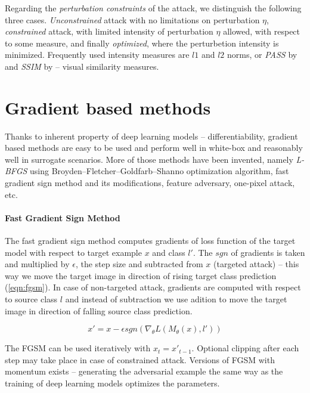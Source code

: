 Regarding the \emph{perturbation constraints} of the attack, we distinguish the following three cases. \emph{Unconstrained} attack with no limitations on perturbation $\eta$, \emph{constrained} attack, with limited intensity of perturbation $\eta$ allowed, with respect to some measure, and finally \emph{optimized}, where the perturbetion intensity is minimized. Frequently used intensity measures are $l1$ and $l2$ norms, or \emph{PASS} by \cite{DBLP:journals/corr/RozsaRB16} and \emph{SSIM} by \cite{ssim} -- visual similarity measures.

\section{Gradient based methods}
\label{sec:advex_gbm}
Thanks to inherent property of deep learning models -- differentiability, gradient based methods are easy to be used and perform well in white-box and reasonably well in surrogate scenarios. More of those methods have been invented, namely \textit{L-BFGS} using Broyden–Fletcher–Goldfarb–Shanno optimization algorithm, fast gradient sign method and its modifications, feature adversary, one-pixel attack, etc.

\paragraph{Fast Gradient Sign Method}
\label{sec:fgsm}
The fast gradient sign method computes gradients of loss function of the target model  with respect to target example $x$ and class $l'$. The $sgn$ of gradients is taken and multiplied by $\epsilon$, the step size and subtracted from $x$ (targeted attack) -- this way we move the target image in direction of rising target class prediction (\ref{eqn:fgsm}). In case of non-targeted attack, gradients are computed with respect to source class $l$ and instead of subtraction we use adition to move the target image in direction of falling source class prediction.

\begin{equation} \label{eqn:fgsm}
x' = x - \epsilon sgn(\nabla_\theta L(M_\theta(x), l'))
\end{equation}

The FGSM can be used iteratively with $x_t = x'_{t-1}$. Optional clipping after each step may take place in case of constrained attack. Versions of FGSM with momentum exists -- generating the adversarial example the same way as the training of deep learning models optimizes the parameters.

